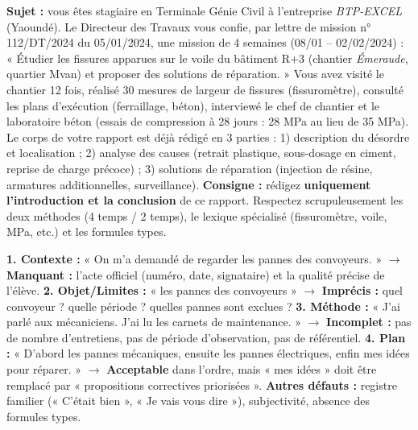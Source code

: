 \documentclass[11pt]{article}
\begin{document}
\begin{exercice}
\textbf{Sujet :} vous êtes stagiaire en Terminale Génie Civil à l'entreprise \emph{BTP-EXCEL} (Yaoundé). Le Directeur des Travaux vous confie, par lettre de mission n° 112/DT/2024 du 05/01/2024, une mission de 4 semaines (08/01 -- 02/02/2024) : « Étudier les fissures apparues sur le voile du bâtiment R+3 (chantier \emph{Émeraude}, quartier Mvan) et proposer des solutions de réparation. » Vous avez visité le chantier 12 fois, réalisé 30 mesures de largeur de fissures (fissuromètre), consulté les plans d'exécution (ferraillage, béton), interviewé le chef de chantier et le laboratoire béton (essais de compression à 28 jours : 28 MPa au lieu de 35 MPa). Le corps de votre rapport est déjà rédigé en 3 parties : 1) description du désordre et localisation ; 2) analyse des causes (retrait plastique, sous-dosage en ciment, reprise de charge précoce) ; 3) solutions de réparation (injection de résine, armatures additionnelles, surveillance).
\textbf{Consigne :} rédigez \textbf{uniquement l'introduction et la conclusion} de ce rapport. Respectez scrupuleusement les deux méthodes (4 temps / 2 temps), le lexique spécialisé (fissuromètre, voile, MPa, etc.) et les formules types.
\end{exercice}

\begin{corrige}[Exercice 1]
\textbf{1. Contexte :} « On m'a demandé de regarder les pannes des convoyeurs. » $\to$ \textbf{Manquant :} l'acte officiel (numéro, date, signataire) et la qualité précise de l'élève.
\textbf{2. Objet/Limites :} « les pannes des convoyeurs » $\to$ \textbf{Imprécis :} quel convoyeur ? quelle période ? quelles pannes sont exclues ?
\textbf{3. Méthode :} « J'ai parlé aux mécaniciens. J'ai lu les carnets de maintenance. » $\to$ \textbf{Incomplet :} pas de nombre d'entretiens, pas de période d'observation, pas de référentiel.
\textbf{4. Plan :} « D'abord les pannes mécaniques, ensuite les pannes électriques, enfin mes idées pour réparer. » $\to$ \textbf{Acceptable} dans l'ordre, mais « mes idées » doit être remplacé par « propositions correctives priorisées ».
\textbf{Autres défauts :} registre familier (« C'était bien », « Je vais vous dire »), subjectivité, absence des formules types.
\end{corrige}
\end{document}
